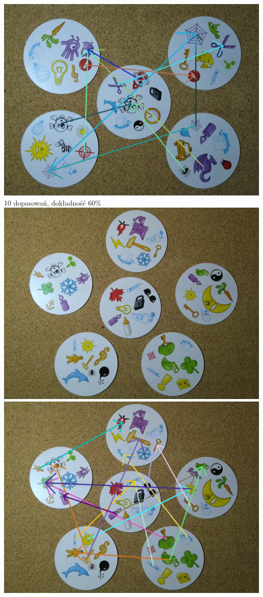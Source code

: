 \documentclass[10pt,a4paper]{article}
\begin{document}
\begin{center}
\includegraphics[scale=0.28]{medium/img_arrows5.jpg}\\
10 dopasowań, dokładność 60\%
\includegraphics[scale=0.28]{medium/dobble19.jpg}
\includegraphics[scale=0.28]{medium/img_arrows6.jpg}\\

\end{center}
\end{document}
